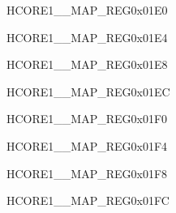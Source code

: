 \begin{register}{H}{CORE1\_\_MAP\_REG}{0x01E0}\label{regdesc:CORE1H264DMA2DINCH0INTMAPREG}
\end{register}\vspace{-3em}


\begin{register}{H}{CORE1\_\_MAP\_REG}{0x01E4}\label{regdesc:CORE1H264DMA2DINCH1INTMAPREG}
\end{register}\vspace{-3em}


\begin{register}{H}{CORE1\_\_MAP\_REG}{0x01E8}\label{regdesc:CORE1H264DMA2DINCH2INTMAPREG}
\end{register}\vspace{-3em}


\begin{register}{H}{CORE1\_\_MAP\_REG}{0x01EC}\label{regdesc:CORE1H264DMA2DINCH3INTMAPREG}
\end{register}\vspace{-3em}


\begin{register}{H}{CORE1\_\_MAP\_REG}{0x01F0}\label{regdesc:CORE1H264DMA2DINCH4INTMAPREG}
\end{register}\vspace{-3em}


\begin{register}{H}{CORE1\_\_MAP\_REG}{0x01F4}\label{regdesc:CORE1H264DMA2DINCH5INTMAPREG}
\end{register}\vspace{-3em}


\begin{register}{H}{CORE1\_\_MAP\_REG}{0x01F8}\label{regdesc:CORE1H264REGINTMAPREG}
\end{register}\vspace{-3em}


\begin{register}{H}{CORE1\_\_MAP\_REG}{0x01FC}\label{regdesc:CORE1ASSISTDEBUGINTMAPREG}
\end{register}\vspace{-3em}

